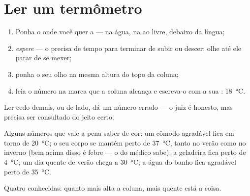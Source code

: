 \section{Ler um termômetro}

\begin{method}\label{met:g3:temperature-thermometers:read}
\begin{enumerate}
  \item Ponha o  onde você quer  a  --- na
        água, na  ao  livre, debaixo da língua;
  \item \emph{espere} --- o  precisa de tempo para terminar de
        subir ou descer; olhe até ele parar de se mexer;
  \item ponha o seu olho na mesma altura do topo da coluna;
  \item leia o número na marca que a coluna alcança e escreva-o com a
        sua : \qty{18}{\celsius}.
\end{enumerate}
Ler cedo demais, ou de lado, dá um número errado --- o juiz é
honesto, mas precisa ser consultado do jeito certo.
\end{method}

\begin{example}\label{ex:g3:temperature-thermometers:livedby}
Alguns números que vale a pena saber de cor: um cômodo agradável fica
em torno de \qty{20}{\celsius}; o seu corpo se mantém perto de
\qty{37}{\celsius}, tanto no verão como no inverno (bem acima disso é
febre --- o  do médico sabe); a geladeira fica perto de
\qty{4}{\celsius}; um dia quente de verão chega a
\qty{30}{\celsius}; a água do banho fica agradável perto de
\qty{35}{\celsius}.
\end{example}

\begin{omfigure}

{\small Quatro  conhecidas: quanto mais alta a coluna,
mais quente está a coisa.}
\end{omfigure}

